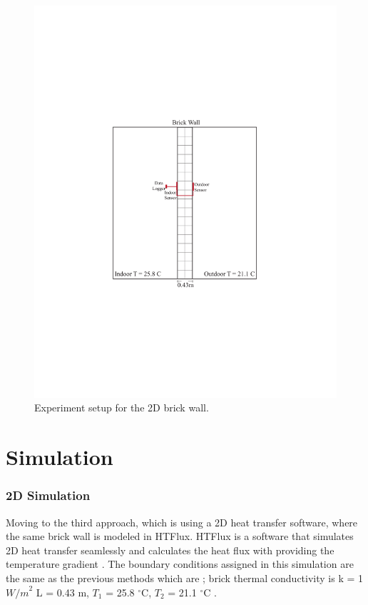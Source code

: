 \begin{figure}[H]
  \centering
  \includegraphics[trim=5.6cm 7.5cm 5.3cm 8cm, clip, width=.6\linewidth]{Figures/2dsection2.pdf}
\caption[2D Section and Setup]{Experiment setup for the 2D brick wall.}
\label{fig:2d2}
\end{figure}




















\section{Simulation}
\subsubsection{2D Simulation}
Moving to the third approach, which is using a 2D heat transfer software, where the same brick wall is modeled in HTFlux. HTFlux is a software that simulates 2D heat transfer seamlessly and calculates the heat flux with providing the temperature gradient \cite{HTflux}. The boundary conditions assigned in this simulation are the same as the previous methods which are ; brick thermal conductivity is k  = 1 ${W/m}^2$ 
L  = 0.43 m,
$T_1$ = 25.8 $^\circ \text{C}$, 
$T_2$  = 21.1  $^\circ \text{C}$ .


